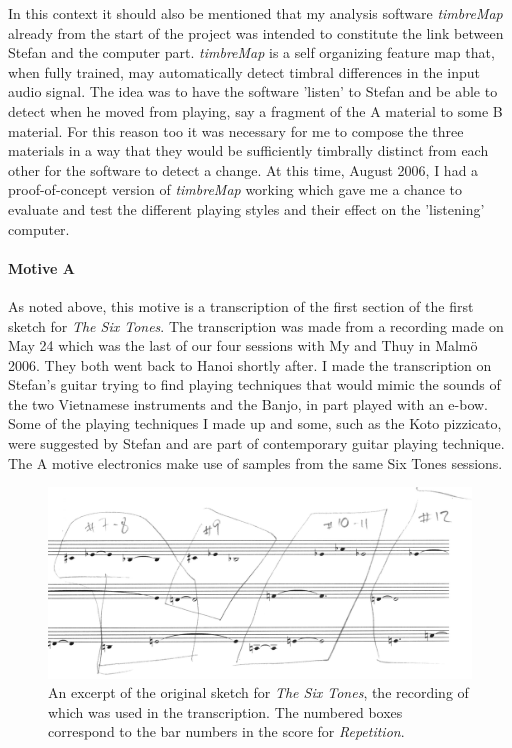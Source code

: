 In this context it should also be mentioned that my analysis software
\emph{timbreMap} already from the start of the project was intended to
constitute the link between Stefan and the computer
part. \emph{timbreMap} is a self organizing feature map that, when
fully trained, may automatically detect timbral differences in the
input audio signal. The idea was to have the software 'listen' to
Stefan and be able to detect when he moved from playing, say a
fragment of the A material to some B material. For this reason too it
was necessary for me to compose the three materials in a way that they
would be sufficiently timbrally distinct from each other for the software
to detect a change. At this time, August 2006, I had a
proof-of-concept version of \emph{timbreMap} working which gave me a
chance to evaluate and test the different playing styles and their
effect on the 'listening' computer.

\paragraph{Motive A}
\label{sec:motive}

As noted above, this motive is a transcription of the first section of
the first sketch for \emph{The Six Tones}. The transcription was made
from a recording made on May 24 which was the last of our four
sessions with My and Thuy in Malm\"{o} 2006. They both went back to
Hanoi shortly after. I made the transcription on Stefan's guitar
trying to find playing techniques that would mimic the sounds of the
two Vietnamese instruments and the Banjo, in part played with an
e-bow. Some of the playing techniques I made up and some, such as the
Koto pizzicato, were suggested by Stefan and are part of contemporary
guitar playing technique. The A motive electronics make use of samples
from the same Six Tones sessions.

\begin{figure}[htb]
  \centering
  \includegraphics[width=\linewidth]{img/SixTones-transcription-1}
  \caption{An excerpt of the original sketch for \emph{The Six Tones}, the
    recording of which was used in the transcription. The numbered
    boxes correspond to the bar numbers in the score for \emph{Repetition}.}
  \label{fig:SixTones-transcription}
\end{figure}


